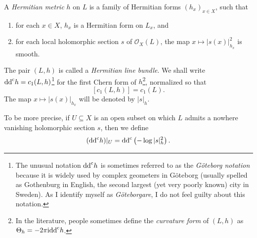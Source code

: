 \begin{definition}\label{def:Hermmetric}
    A \emph{Hermitian metric} $h$ on $L$ is a family of Hermitian forms $(h_x)_{x\in X}$, such that
    \begin{enumerate}
        \item\label{itm:def:Hermmetric:1} for each $x\in X$, $h_x$ is a Hermitian form on $L_x$, and
        \item\label{itm:def:Hermmetric:2} for each local holomorphic section $s$ of $\mathcal{O}_X(L)$, the map $x\mapsto |s(x)|^2_{h_x}$ is smooth.
    \end{enumerate}
    The pair $(L,h)$ is called a \emph{Hermitian line bundle}.
    We shall write $\mathrm{dd}^{\mathrm{c}} h=c_1(L,h)$\footnote{The unusual notation $\mathrm{dd}^{\mathrm{c}} h$ is sometimes referred to as the \emph{Göteborg notation} because it is widely used by complex geometers in Göteborg (usually spelled as Gothenburg in English, the second largest (yet very poorly known) city in Sweden). As I identify myself as \emph{Göteborgare}, I do not feel guilty about this notation.} for the first Chern form of $h$\footnote{In the literature, people sometimes define the \emph{curvature form} of $(L,h)$ as $\Theta_{h}=-2\pi\mathrm{i}\mathrm{dd}^{\mathrm{c}} h$.}, normalized so that
    \[
    [c_1(L,h)]=c_1(L).
    \]
    The map $x\mapsto |s(x)|_{h_x}$ will be denoted by $|s|_h$.

    To be more precise, if $U\subseteq X$ is an open subset on which $L$ admits a nowhere vanishing holomorphic section $s$, then we define
    \[
    (\mathrm{dd}^{\mathrm{c}} h)|_U=\mathrm{dd}^{\mathrm{c}} \left(-\log |s|_h^2\right).
    \]
\end{definition}


